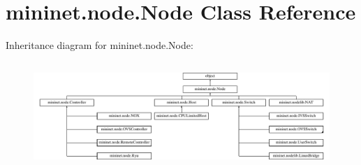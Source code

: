 \hypertarget{classmininet_1_1node_1_1Node}{\section{mininet.\-node.\-Node Class Reference}
\label{classmininet_1_1node_1_1Node}
}
Inheritance diagram for mininet.\-node.\-Node\-:\begin{figure}[H]
\begin{center}
\leavevmode
\includegraphics[height=4.083333cm]{classmininet_1_1node_1_1Node}
\end{center}
\end{figure}
